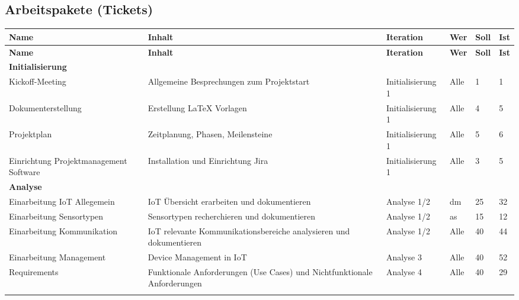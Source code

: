 \begin{landscape}
\subsection{Arbeitspakete (Tickets)}
\begin{longtable}{ p{5.5cm} p{8cm} l l p{1cm} p{1cm} }

\hline 
\multicolumn{1}{p{5.5cm}}{\textbf{Name}} & \multicolumn{1}{p{8cm}}{\textbf{Inhalt}} & \multicolumn{1}{l}{\textbf{Iteration}} & \multicolumn{1}{l}{\textbf{Wer}} & \multicolumn{1}{p{1cm}}{\textbf{Soll}} & \multicolumn{1}{p{1cm}}{\textbf{Ist}} \\ \hline 
\endfirsthead

\hline 
\multicolumn{1}{p{5.5cm}}{\textbf{Name}} & \multicolumn{1}{p{8cm}}{\textbf{Inhalt}} & \multicolumn{1}{l}{\textbf{Iteration}} & \multicolumn{1}{l}{\textbf{Wer}} & \multicolumn{1}{p{1cm}}{\textbf{Soll}} & \multicolumn{1}{p{1cm}}{\textbf{Ist}} \\ \hline 
\endhead

\textbf{Initialisierung}&&&&\\ \addlinespace
Kickoff-Meeting & Allgemeine Besprechungen zum Projektstart & Initialisierung 1 & Alle & 1 & 1 \\ \addlinespace
Dokumenterstellung & Erstellung \LaTeX{} Vorlagen & Initialisierung 1 & Alle & 4 & 5 \\ \addlinespace
Projektplan & Zeitplanung, Phasen, Meilensteine & Initialisierung 1 & Alle & 5 & 6 \\ \addlinespace
Einrichtung Projektmanagement Software & Installation und Einrichtung Jira & Initialisierung 1 & Alle & 3 & 5 \\ \addlinespace

\textbf{Analyse}&&&&\\ \addlinespace
Einarbeitung IoT Allegemein & IoT Übersicht erarbeiten und dokumentieren & Analyse 1/2 & dm & 25 & 32\\ \addlinespace
Einarbeitung Sensortypen & Sensortypen recherchieren und dokumentieren & Analyse 1/2 & as & 15 & 12\\ \addlinespace
Einarbeitung Kommunikation & IoT relevante Kommunikationsbereiche analysieren und dokumentieren & Analyse 1/2 & Alle & 40 & 44\\ \addlinespace
Einarbeitung Management & Device Management in IoT & Analyse 3 & Alle & 40 & 52\\ \addlinespace
Requirements & Funktionale Anforderungen (Use Cases) und Nichtfunktionale Anforderungen & Analyse 4 & Alle & 40 & 29\\ \addlinespace



\end{longtable}
\end{landscape}

